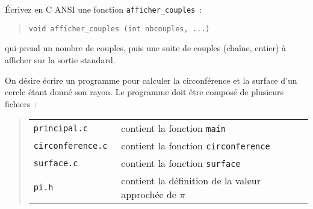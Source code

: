 %



% 


\question

Écrivez en C ANSI une fonction {\tt afficher\_couples}~:

\begin {quote}
    \verb|void afficher_couples (int nbcouples, ...)|
\end {quote}

qui prend un nombre de couples, puis une suite de couples
(chaîne, entier) à afficher sur la sortie standard.


\question

On désire écrire un programme pour calculer la circonférence et la
surface d'un cercle étant donné son rayon.  Le programme doit être
composé de plusieurs fichiers~:

\begin {quote}
    \renewcommand {\arraystretch} {1}
    \begin {tabular} {ll}
	\tt principal.c & contient la fonction {\tt main} \\
	\tt circonference.c & contient la fonction {\tt circonference} \\
	\tt surface.c & contient la fonction {\tt surface} \\
	\tt pi.h & contient la définition de la valeur approchée de $\pi$
    \end {tabular}
\end {quote}



